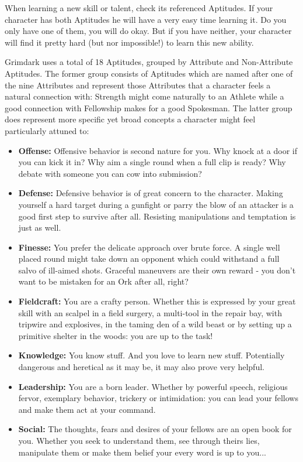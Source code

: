 When learning a new skill or talent, check its referenced Aptitudes. 
If your character has both Aptitudes he will have a very easy time learning it.
Do you only have one of them, you will do okay.
But if you have neither, your character will find it pretty hard (but nor impossible!) to learn this new ability.

Grimdark uses a total of 18 Aptitudes, grouped by Attribute and Non-Attribute Aptitudes.
The former group consists of Aptitudes which are named after one of the nine Attributes and represent those Attributes that a character feels a natural connection with: Strength might come naturally to an Athlete while a good connection with Fellowship makes for a good Spokesman.
The latter group does represent more specific yet broad concepts a character might feel particularly attuned to:
\begin{itemize}
	\item \textbf{Offense:} Offensive behavior is second nature for you. Why knock at a door if you can kick it in? Why aim a single round when a full clip is ready? Why debate with someone you can cow into submission?
	\item \textbf{Defense:} Defensive behavior is of great concern to the character. Making yourself a hard target during a gunfight or parry the blow of an attacker is a good first step to survive after all. Resisting manipulations and temptation is just as well.
	\item \textbf{Finesse:} You prefer the delicate approach over brute force. A single well placed round might take down an opponent which could withstand a full salvo of ill-aimed shots. Graceful maneuvers are their own reward - you don't want to be mistaken for an Ork after all, right?
	\item \textbf{Fieldcraft:} You are a crafty person. Whether this is expressed by your great skill with an scalpel in a field surgery, a multi-tool in the repair bay, with tripwire and explosives, in the taming den of a wild beast or by setting up a primitive shelter in the woods: you are up to the task!
	\item \textbf{Knowledge:} You know stuff. And you love to learn new stuff. Potentially dangerous and heretical as it may be, it may also prove very helpful.
	\item \textbf{Leadership:} You are a born leader. Whether by powerful speech, religious fervor, exemplary behavior, trickery or intimidation: you can lead your fellows and make them act at your command.
	\item \textbf{Social:} The thoughts, fears and desires of your fellows are an open book for you. Whether you seek to understand them, see through theirs lies, manipulate them or make them belief your every word is up to you...

\end{itemize}

